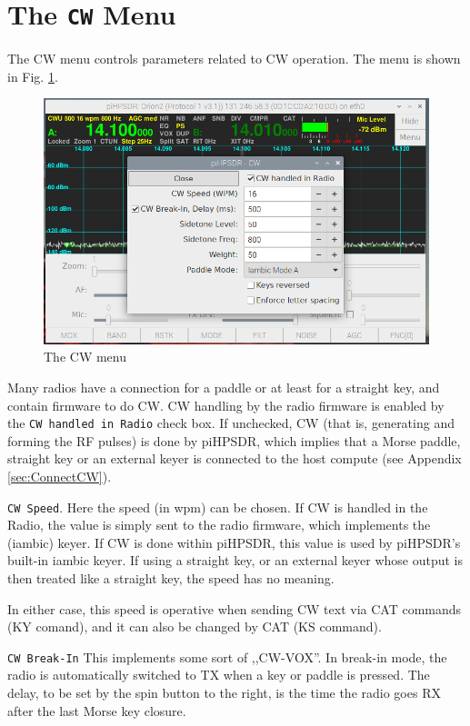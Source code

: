 \documentclass[12pt]{book}
\def\rett#1{\texttt{\color{red}#1}}
\begin{document}
\section{The \texttt{CW} Menu}
The CW menu controls parameters related to CW operation. The menu
is shown in Fig. \ref{fig:CWMenu}.

\begin{figure}[ht]
\center
\includegraphics[width=12cm]{CWMenu.png}
\caption{The CW menu}
\label{fig:CWMenu}
\end{figure}

Many radios have a connection for a paddle or at least for
a straight key, and contain firmware to do CW. CW handling by
the radio firmware is enabled by the \rett{CW handled in Radio}
check box. If unchecked, CW (that is, generating and forming
the RF pulses) is done by piHPSDR, which implies that
a Morse paddle, straight key or an external keyer is connected
to the host compute (see Appendix \ref{sec:ConnectCW}). 

\rett{CW Speed}. Here the speed (in wpm) can be chosen. If CW is
handled in the Radio, the value is simply sent to the radio firmware,
which implements the (iambic) keyer. If CW is done within piHPSDR,
this value is used by piHPSDR's built-in iambic keyer. If using
a straight key, or an external keyer whose output is then treated
like a straight key, the speed has no meaning.

In either case, this speed is operative when sending CW text via
CAT commands (KY comand), and it can also be changed by CAT
(KS command).

\rett{CW Break-In} This implements some sort of ,,CW-VOX''. In
break-in mode, the radio is automatically switched to TX when
a key or paddle is pressed. The delay, to be set by the spin
button to the right, is the time the radio goes RX after the
last Morse key closure.
\end{document}
